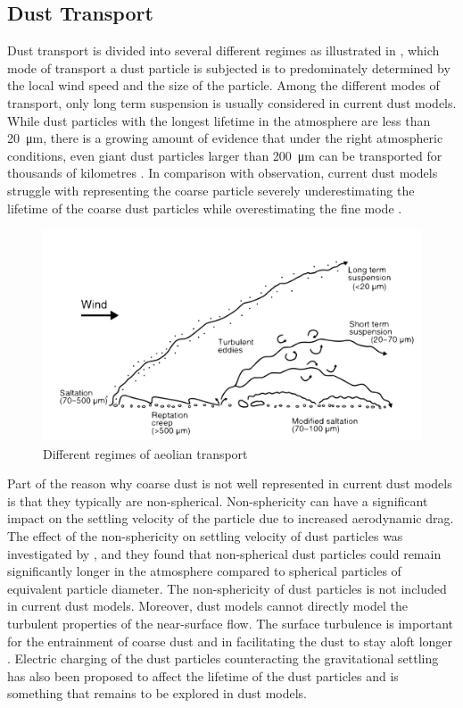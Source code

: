 \subsection{Dust Transport}
Dust transport is divided into several different regimes as illustrated in , which mode of transport a dust particle is subjected is to predominately determined by the local wind speed and the size of the particle. Among the different modes of transport, only long term suspension is usually considered in current dust models.
While dust particles with the longest lifetime in the atmosphere are less than \SI{20}{\micro\metre}, there is a growing amount of evidence that under the right atmospheric conditions, even giant dust particles larger than \SI{200}{\micro\metre} can be transported for thousands of kilometres \parencite{van2018mysterious}. 
In comparison with observation, current dust models struggle with representing the coarse particle severely underestimating the lifetime of the coarse dust particles while overestimating the fine mode \parencite{adebiyi2020dust}. 
\begin{figure}[htbp]
  \centering
  \includegraphics[draft=false,width = \textwidth]{texfiles/figs/aeolian_transport_Parsons_Abrahams.pdf}
  \caption{Different regimes of aeolian transport \parencite{nickling2009aeolian}}
  \label{fig:modes_of_dust_transport}
\end{figure}

Part of the reason why coarse dust is not well represented in current dust models is that they typically are non-spherical. Non-sphericity can have a significant impact on the settling velocity of the particle due to increased aerodynamic drag. The effect of the non-sphericity on settling velocity of dust particles was investigated by \textcite{mallios2020effects}, and they found that non-spherical dust particles could remain significantly longer in the atmosphere compared to spherical particles of equivalent particle diameter. The non-sphericity of dust particles is not included in current dust models. Moreover, dust models cannot directly model the turbulent properties of the near-surface flow. The surface turbulence is important for the entrainment of coarse dust \parencite{klose2013large} and in facilitating the dust to stay aloft longer \parencite{ryder2013impact}. Electric charging of the dust particles counteracting the gravitational settling has also been proposed to affect the lifetime of the dust particles and is something that remains to be explored in dust models.     

